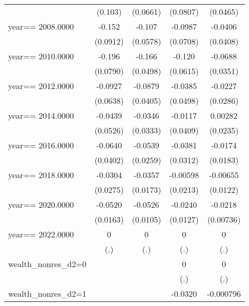 \begin{table}[htbp]
\begin{tabular}{l*{4}{c}}
                &  (0.103)         & (0.0661)         & (0.0807)         & (0.0465)         \\
year==  2008.0000&   -0.152\sym{*}  &   -0.107\sym{*}  &  -0.0987         &  -0.0406         \\
                & (0.0912)         & (0.0578)         & (0.0708)         & (0.0408)         \\
year==  2010.0000&   -0.196\sym{**} &   -0.166\sym{***}&   -0.120\sym{*}  &  -0.0688\sym{*}  \\
                & (0.0790)         & (0.0498)         & (0.0615)         & (0.0351)         \\
year==  2012.0000&  -0.0927         &  -0.0879\sym{**} &  -0.0385         &  -0.0227         \\
                & (0.0638)         & (0.0405)         & (0.0498)         & (0.0286)         \\
year==  2014.0000&  -0.0439         &  -0.0346         &  -0.0117         &  0.00282         \\
                & (0.0526)         & (0.0333)         & (0.0409)         & (0.0235)         \\
year==  2016.0000&  -0.0640         &  -0.0539\sym{**} &  -0.0381         &  -0.0174         \\
                & (0.0402)         & (0.0259)         & (0.0312)         & (0.0183)         \\
year==  2018.0000&  -0.0304         &  -0.0357\sym{**} & -0.00598         & -0.00655         \\
                & (0.0275)         & (0.0173)         & (0.0213)         & (0.0122)         \\
year==  2020.0000&  -0.0520\sym{***}&  -0.0526\sym{***}&  -0.0240\sym{*}  &  -0.0218\sym{***}\\
                & (0.0163)         & (0.0105)         & (0.0127)         &(0.00736)         \\
year==  2022.0000&        0         &        0         &        0         &        0         \\
                &      (.)         &      (.)         &      (.)         &      (.)         \\
wealth\_nonres\_d2=0&                  &                  &        0         &        0         \\
                &                  &                  &      (.)         &      (.)         \\
wealth\_nonres\_d2=1&                  &                  &  -0.0320         &-0.000796         \\

\end{tabular}
\end{table}

